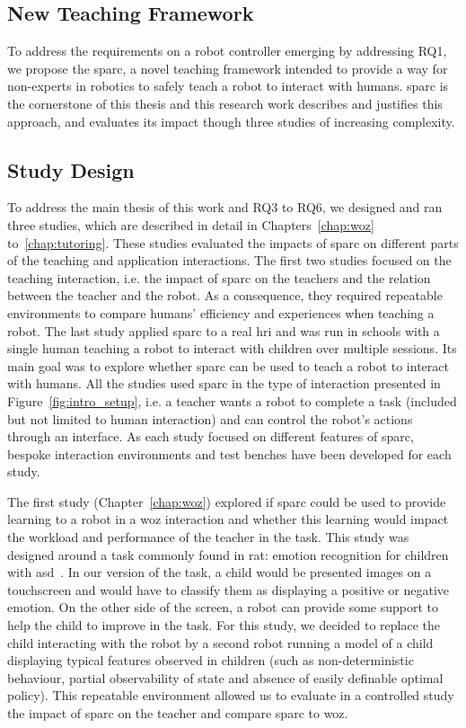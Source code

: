 \subsection{New Teaching Framework}

To address the requirements on a robot controller emerging by addressing RQ1, we propose the \gls{sparc}, a novel teaching framework intended to provide a way for non-experts in robotics to safely teach a robot to interact with humans. \gls{sparc} is the cornerstone of this thesis and this research work describes and justifies this approach, and evaluates its impact though three studies of increasing complexity.

\subsection{Study Design} 

To address the main thesis of this work and RQ3 to RQ6, we designed and ran three studies, which are described in detail in Chapters~\ref{chap:woz} to~\ref{chap:tutoring}. These studies evaluated the impacts of \gls{sparc} on different parts of the teaching and application interactions. The first two studies focused on the teaching interaction, i.e. the impact of \gls{sparc} on the teachers and the relation between the teacher and the robot. As a consequence, they required repeatable environments to compare humans' efficiency and experiences when teaching a robot. The last study applied \gls{sparc} to a real \gls{hri} and was run in schools with a single human teaching a robot to interact with children over multiple sessions. Its main goal was to explore whether \gls{sparc} can be used to teach a robot to interact with humans. All the studies used \gls{sparc} in the type of interaction presented in Figure~\ref{fig:intro_setup}, i.e. a teacher wants a robot to complete a task (included but not limited to human interaction) and can control the robot's actions through an interface. As each study focused on different features of \gls{sparc}, bespoke interaction environments and test benches have been developed for each study.

The first study (Chapter~\ref{chap:woz}) explored if \gls{sparc} could be used to provide learning to a robot in a \gls{woz} interaction and whether this learning would impact the workload and performance of the teacher in the task. This study was designed around a task commonly found in \gls{rat}: emotion recognition for children with \gls{asd}~\citep{dautenhahn2004towards}. In our version of the task, a child would be presented images on a touchscreen and would have to classify them as displaying a positive or negative emotion. On the other side of the screen, a robot can provide some support to help the child to improve in the task. For this study, we decided to replace the child interacting with the robot by a second robot running a model of a child displaying typical features observed in children (such as non-deterministic behaviour, partial observability of state and absence of easily definable optimal policy). This repeatable environment allowed us to evaluate in a controlled study the impact of \gls{sparc} on the teacher and compare \gls{sparc} to \gls{woz}.

